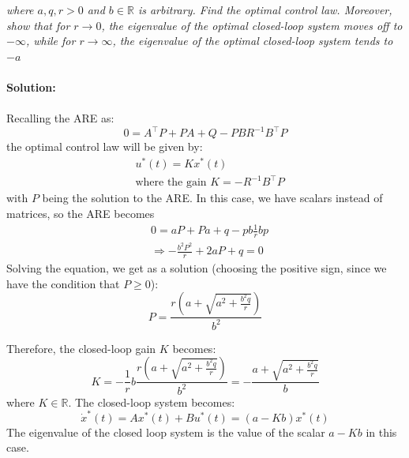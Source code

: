 \emph{where $a, q, r > 0$ and $b \in \mathbb{R}$ is arbitrary. Find the optimal control law. Moreover, show that for $r \to 0 $,
the eigenvalue of the optimal closed-loop system moves off to $- \infty$, while for $r \to \infty$, the eigenvalue of the
optimal closed-loop system tends to $−a$}
\\
\\
\textbf{Solution:}\\
\\
Recalling the ARE as:
\begin{equation}
    0 = A^\top P + PA + Q -PBR^{-1}B^\top P
\end{equation}
the optimal control law will be given by:
\begin{align}
    &u^*(t) = K x^*(t)\\
    &\text{where the gain } K = -R ^{-1} B^\top P
\end{align}
with $P$ being the solution to the ARE. In this case, we have scalars instead of matrices, so the ARE becomes
\begin{align}
    &0 = aP + Pa +q - pb\frac{1}{r}bp\\
    &\Longrightarrow -\frac{b^2 P^2}{r} + 2aP + q = 0
\end{align}
Solving the equation, we get as a solution (choosing the positive sign, since we have the condition that $P \geq 0$):
\begin{equation}
    P = \frac{r \left(a  + \sqrt{a^2 + \frac{b^2 q}{r}} \right)}{b^2} 
\end{equation}

Therefore, the closed-loop gain $K$ becomes:
\begin{equation}
    K = - \frac{1}{r} b \frac{r \left(a +  \sqrt{a^2 + \frac{b^2 q}{r}} \right)}{b^{2}} = - \frac{a + \sqrt{a^2 + \frac{b^2 q}{r}}}{b}
\end{equation}
where $K \in \mathbb{R}$. The closed-loop system becomes:
\begin{equation}
    \Dot{x}^*(t) = Ax^*(t) + Bu^*(t) = (a - Kb)x^*(t)
\end{equation}
The eigenvalue of the closed loop system is the value of the scalar $a - Kb$ in this case.
